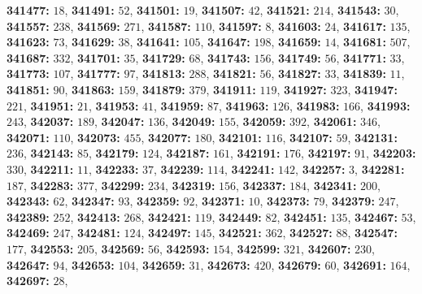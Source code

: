 \textsf{\bfseries 341477:} $18$, \textsf{\bfseries 341491:} $52$, \textsf{\bfseries 341501:} $19$, \textsf{\bfseries 341507:} $42$, \textsf{\bfseries 341521:} $214$, \textsf{\bfseries 341543:} $30$, \textsf{\bfseries 341557:} $238$, \textsf{\bfseries 341569:} $271$, \textsf{\bfseries 341587:} $110$, \textsf{\bfseries 341597:} $8$, \textsf{\bfseries 341603:} $24$, \textsf{\bfseries 341617:} $135$, \textsf{\bfseries 341623:} $73$, \textsf{\bfseries 341629:} $38$, \textsf{\bfseries 341641:} $105$, \textsf{\bfseries 341647:} $198$, \textsf{\bfseries 341659:} $14$, \textsf{\bfseries 341681:} $507$, \textsf{\bfseries 341687:} $332$, \textsf{\bfseries 341701:} $35$, \textsf{\bfseries 341729:} $68$, \textsf{\bfseries 341743:} $156$, \textsf{\bfseries 341749:} $56$, \textsf{\bfseries 341771:} $33$, \textsf{\bfseries 341773:} $107$, \textsf{\bfseries 341777:} $97$, \textsf{\bfseries 341813:} $288$, \textsf{\bfseries 341821:} $56$, \textsf{\bfseries 341827:} $33$, \textsf{\bfseries 341839:} $11$, \textsf{\bfseries 341851:} $90$, \textsf{\bfseries 341863:} $159$, \textsf{\bfseries 341879:} $379$, \textsf{\bfseries 341911:} $119$, \textsf{\bfseries 341927:} $323$, \textsf{\bfseries 341947:} $221$, \textsf{\bfseries 341951:} $21$, \textsf{\bfseries 341953:} $41$, \textsf{\bfseries 341959:} $87$, \textsf{\bfseries 341963:} $126$, \textsf{\bfseries 341983:} $166$, \textsf{\bfseries 341993:} $243$, \textsf{\bfseries 342037:} $189$, \textsf{\bfseries 342047:} $136$, \textsf{\bfseries 342049:} $155$, \textsf{\bfseries 342059:} $392$, \textsf{\bfseries 342061:} $346$, \textsf{\bfseries 342071:} $110$, \textsf{\bfseries 342073:} $455$, \textsf{\bfseries 342077:} $180$, \textsf{\bfseries 342101:} $116$, \textsf{\bfseries 342107:} $59$, \textsf{\bfseries 342131:} $236$, \textsf{\bfseries 342143:} $85$, \textsf{\bfseries 342179:} $124$, \textsf{\bfseries 342187:} $161$, \textsf{\bfseries 342191:} $176$, \textsf{\bfseries 342197:} $91$, \textsf{\bfseries 342203:} $330$, \textsf{\bfseries 342211:} $11$, \textsf{\bfseries 342233:} $37$, \textsf{\bfseries 342239:} $114$, \textsf{\bfseries 342241:} $142$, \textsf{\bfseries 342257:} $3$, \textsf{\bfseries 342281:} $187$, \textsf{\bfseries 342283:} $377$, \textsf{\bfseries 342299:} $234$, \textsf{\bfseries 342319:} $156$, \textsf{\bfseries 342337:} $184$, \textsf{\bfseries 342341:} $200$, \textsf{\bfseries 342343:} $62$, \textsf{\bfseries 342347:} $93$, \textsf{\bfseries 342359:} $92$, \textsf{\bfseries 342371:} $10$, \textsf{\bfseries 342373:} $79$, \textsf{\bfseries 342379:} $247$, \textsf{\bfseries 342389:} $252$, \textsf{\bfseries 342413:} $268$, \textsf{\bfseries 342421:} $119$, \textsf{\bfseries 342449:} $82$, \textsf{\bfseries 342451:} $135$, \textsf{\bfseries 342467:} $53$, \textsf{\bfseries 342469:} $247$, \textsf{\bfseries 342481:} $124$, \textsf{\bfseries 342497:} $145$, \textsf{\bfseries 342521:} $362$, \textsf{\bfseries 342527:} $88$, \textsf{\bfseries 342547:} $177$, \textsf{\bfseries 342553:} $205$, \textsf{\bfseries 342569:} $56$, \textsf{\bfseries 342593:} $154$, \textsf{\bfseries 342599:} $321$, \textsf{\bfseries 342607:} $230$, \textsf{\bfseries 342647:} $94$, \textsf{\bfseries 342653:} $104$, \textsf{\bfseries 342659:} $31$, \textsf{\bfseries 342673:} $420$, \textsf{\bfseries 342679:} $60$, \textsf{\bfseries 342691:} $164$, \textsf{\bfseries 342697:} $28$, 
